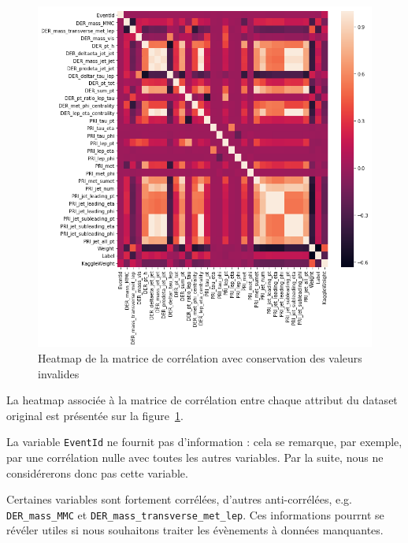 \documentclass[12pt]{article}
\newcommand{\figref}[1]{figure~\ref{#1}}
\begin{document}
\begin{figure}[H]
    \center 
    \includegraphics[width=\textwidth]{images/heatmap_old.png}
    \caption{Heatmap de la matrice de corrélation avec conservation des valeurs
    invalides}
    \label{img:heatmap-old}
\end{figure}

La heatmap associée à la matrice de corrélation entre chaque attribut du dataset
original est présentée sur la \figref{img:heatmap-old}. 

La variable \texttt{EventId} ne fournit pas d'information : cela se remarque,
par exemple, par une corrélation nulle avec toutes les autres variables. Par la
suite, nous ne considérerons donc pas cette variable.


Certaines variables sont fortement corrélées, d'autres anti-corrélées, e.g.
\texttt{DER\_mass\_MMC} et \texttt{DER\_mass\_transverse\_met\_lep}. Ces
informations pourrnt se révéler utiles si nous souhaitons traiter les évènements à
données manquantes.
\end{document}
